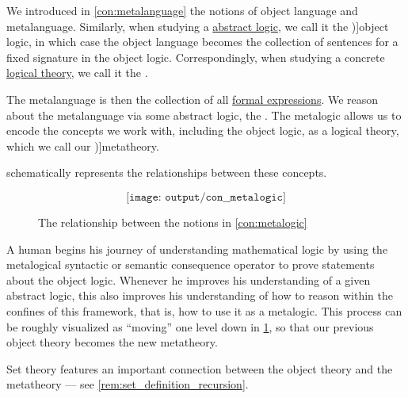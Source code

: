 \begin{concept}\label{con:metalogic}
  We introduced in \cref{con:metalanguage} the notions of object language and metalanguage. Similarly, when studying a \hyperref[def:abstract_logic]{abstract logic}, we call it the \term[en=object logic (\cite[3]{Kleene2002Logic})]{object logic}, in which case the object language becomes the collection of sentences for a fixed signature in the object logic. Correspondingly, when studying a concrete \hyperref[def:logical_theory]{logical theory}, we call it the .

  The metalanguage is then the collection of all \hyperref[con:expression]{formal expressions}. We reason about the metalanguage via some abstract logic, the . The metalogic allows us to encode the concepts we work with, including the object logic, as a logical theory, which we call our \term[en=metatheory (\cite[199]{Kleene2002Logic})]{metatheory}.

   schematically represents the relationships between these concepts.

  \begin{figure}[!ht]
    \begin{equation*}
      \texttt{[image: output/con\_\_metalogic]}
    \end{equation*}
    \caption{The relationship between the notions in \cref{con:metalogic}}\label{fig:con:metalogic}
  \end{figure}

  A human begins his journey of understanding mathematical logic by using the metalogical syntactic or semantic consequence operator to prove statements about the object logic. Whenever he improves his understanding of a given abstract logic, this also improves his understanding of how to reason within the confines of this framework, that is, how to use it as a metalogic. This process can be roughly visualized as \enquote{moving} one level down in \cref{fig:con:metalogic}, so that our previous object theory becomes the new metatheory.
\end{concept}
\begin{comments}
  \item Set theory features an important connection between the object theory and the metatheory --- see \cref{rem:set_definition_recursion}.
\end{comments}

